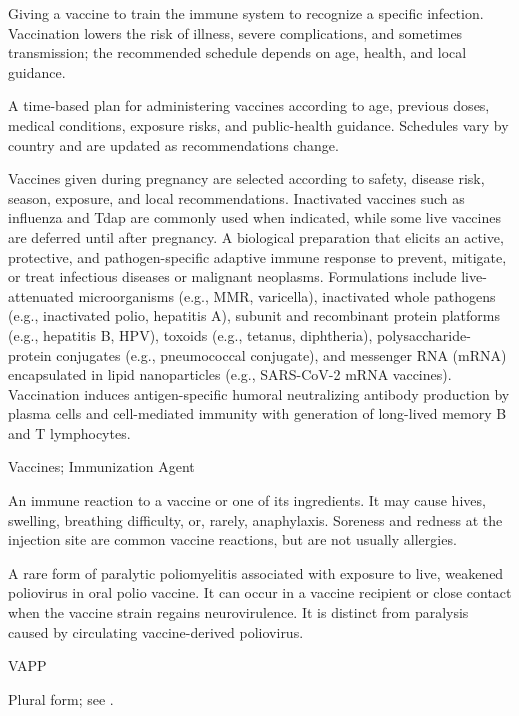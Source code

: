  Giving a vaccine to train the immune system to recognize a specific infection. Vaccination lowers the risk of illness, severe complications, and sometimes transmission; the recommended schedule depends on age, health, and local guidance.

 A time-based plan for administering vaccines according to age, previous doses, medical conditions, exposure risks, and public-health guidance. Schedules vary by country and are updated as recommendations change.

 Vaccines given during pregnancy are selected according to safety, disease risk, season, exposure, and local recommendations. Inactivated vaccines such as influenza and Tdap are commonly used when indicated, while some live vaccines are deferred until after pregnancy.
 A biological preparation that elicits an active, protective, and pathogen-specific adaptive immune response to prevent, mitigate, or treat infectious diseases or malignant neoplasms. Formulations include live-attenuated microorganisms (e.g., MMR, varicella), inactivated whole pathogens (e.g., inactivated polio, hepatitis A), subunit and recombinant protein platforms (e.g., hepatitis B, HPV), toxoids (e.g., tetanus, diphtheria), polysaccharide-protein conjugates (e.g., pneumococcal conjugate), and messenger RNA (mRNA) encapsulated in lipid nanoparticles (e.g., SARS-CoV-2 mRNA vaccines). Vaccination induces antigen-specific humoral neutralizing antibody production by plasma cells and cell-mediated immunity with generation of long-lived memory B and T lymphocytes.

\synonyms
Vaccines; Immunization Agent

 An immune reaction to a vaccine or one of its ingredients. It may cause hives, swelling, breathing difficulty, or, rarely, anaphylaxis. Soreness and redness at the injection site are common vaccine reactions, but are not usually allergies.

 A rare form of paralytic poliomyelitis
associated with exposure to live, weakened poliovirus in oral polio vaccine. It can occur in
a vaccine recipient or close contact when the vaccine strain regains neurovirulence. It is
distinct from paralysis caused by circulating vaccine-derived poliovirus.

\synonyms
VAPP

 Plural form; see .

